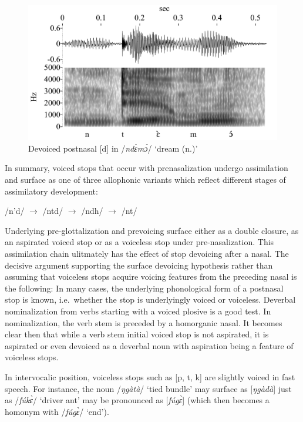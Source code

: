 \begin{figure} 
\centering
\includegraphics[width=\textwidth]{figures/ntemo-mini}
\caption{Devoiced postnasal [d] in /{\itshape ndɛ̀mɔ́}/ `dream (n.)'}
\label{Fig:ntemo}
\end{figure}

In summary, voiced stops that occur with prenasalization undergo assimilation and surface as one of three allophonic variants which reflect different stages of assimilatory development:
\begin{center}
/n'd/ $\rightarrow$ /ntd/ $\rightarrow$ /ndh/ $\rightarrow$ /nt/
\end{center}

Underlying pre-glottalization and prevoicing surface either as a double closure, as an aspirated voiced stop or as a voiceless stop under pre-nasalization. This assimilation chain ulitmately has the effect of stop devoicing after a nasal.
The decisive argument supporting the surface devoicing hypothesis rather than assuming that voiceless stops acquire voicing features from the preceding nasal is the following: In many cases, the underlying phonological form of a postnasal stop is known, i.e.\ whether the stop is underlyingly voiced or voiceless. Deverbal nominalization from verbs starting with a voiced plosive is a good test. In nominalization, the verb stem is preceded by a homorganic nasal. It becomes clear then that while a verb stem initial voiced stop is not aspirated, it is aspirated or even devoiced as a deverbal noun with aspiration being a feature of voiceless stops.



\fi





In intervocalic position, voiceless stops such as [p, t, k] are slightly voiced in fast speech. For instance, the noun /{\itshape ŋgàtà}/ `tied bundle' may surface as [{\itshape ŋgàdà}] just as /{\itshape fúkɛ̀}/ `driver ant' may be pronounced as [{\itshape fúgɛ̀}] (which then becomes a homonym with /{\itshape fúgɛ̀}/ `end'). 


